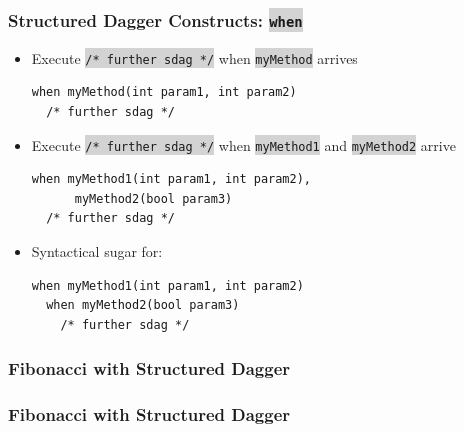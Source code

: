 \documentclass{beamer}
\newcommand{\code}[1]{\colorbox{lightgray}{\texttt{#1}}}
\begin{document}
\begin{frame}[fragile]
  \frametitle{Structured Dagger Constructs: \code{when}}
  \begin{itemize}
  \item Execute \code{/* further sdag */} when \code{myMethod} arrives
  \begin{lstlisting}[basicstyle=\scriptsize]
when myMethod(int param1, int param2)
  /* further sdag */
  \end{lstlisting}

  \item Execute \code{/* further sdag */} when \code{myMethod1} and \code{myMethod2} arrive
  \begin{lstlisting}[basicstyle=\scriptsize]
when myMethod1(int param1, int param2),
      myMethod2(bool param3)
  /* further sdag */
  \end{lstlisting}

\item Syntactical sugar for:
  \begin{lstlisting}[basicstyle=\scriptsize]
when myMethod1(int param1, int param2)
  when myMethod2(bool param3)
    /* further sdag */
  \end{lstlisting}

  \end{itemize}
\end{frame}

\begin{frame}[fragile]
  \frametitle{Fibonacci with Structured Dagger}
  
\end{frame}

\begin{frame}[fragile]
  \frametitle{Fibonacci with Structured Dagger}
  
\end{frame}
\end{document}

